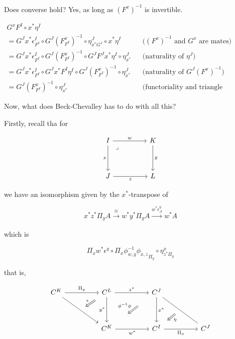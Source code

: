 \documentclass[10pt, oneside]{article}
\begin{document}
Does converse hold? Yes, as long as $(F^x)^{-1}$ is invertible.


\begin{align*}
         G^x F^I \circ x^\ast \eta^I 
         \\
         = G^J x^\ast \epsilon^I_{F^I} \circ G^J (F^x_{F^I})^{-1}  \circ \eta^J_{x^\ast G^J} \circ x^\ast \eta^I && \text{($(F^x)^{-1}$ and $G^x$ are mates)}
         \\
         =  G^J x^\ast \epsilon^I_{F^I} \circ G^J (F^x_{F^I})^{-1} \circ G^J F^J x^\ast \eta^I \circ \eta^J_{x^\ast}  && \text{(naturality of $\eta^J$)}
         \\
         =  G^J x^\ast \epsilon^I_{F^I} \circ G^J x^\ast F^I \eta^I \circ G^J (F^x_{F^I})^{-1} \circ \eta^J_{x^\ast}  && \text{(naturality of $G^J (F^x)^{-1}$)}
         \\
         = G^J (F^x_{F^I})^{-1} \circ \eta^J_{x^\ast}  && \text{(functoriality and triangle identities)}
\end{align*}

Now, what does Beck-Chevalley has to do with all this?

Firstly, recall tha for

    \[\begin{tikzcd}[ampersand replacement=\&]
	I \&\& K \\
	\\
	J \&\& L
	\arrow["w", from=1-1, to=1-3]
	\arrow["x"', from=1-1, to=3-1]
	\arrow["z"', from=3-1, to=3-3]
	\arrow["y", from=1-3, to=3-3]
	\arrow["\lrcorner"{anchor=center, pos=0.125}, draw=none, from=1-1, to=3-3]
    \end{tikzcd}\]

    \noindent we have an isomorphism given by the $x^\ast$-transpose of

    $$x^\ast z^\ast \Pi_y A \xrightarrow[]{\cong} w^\ast y^\ast \Pi_y A \xrightarrow[]{w^\ast \epsilon^y_A} w^\ast A$$

    \noindent which is

    $$\Pi_x w^\ast \epsilon^y \circ \Pi_x {\phi^{-1}_{w, y} \phi_{x, z}}_{\Pi_y}  \circ \eta^x_{z^\ast \Pi_y}$$

    \noindent that is,

    \[\begin{tikzcd}
	{C^K} && {C^L} && {C^J} \\
	\\
	&& {C^K} && {C^I} && {C^J}
	\arrow["{z^\ast}", from=1-3, to=1-5]
	\arrow["{x^\ast}", from=1-5, to=3-5]
	\arrow["{y^\ast}"', from=1-3, to=3-3]
	\arrow["{w^\ast}"', from=3-3, to=3-5]
	\arrow["{\phi^{-1} \phi}"', shorten <=22pt, shorten >=22pt, Rightarrow, from=1-5, to=3-3]
	\arrow["{\Pi_x}"', from=3-5, to=3-7]
	\arrow[""{name=0, anchor=center, inner sep=0}, no head, from=1-5, to=3-7]
	\arrow[""{name=1, anchor=center, inner sep=0}, from=1-1, to=3-3]
	\arrow["{\Pi_y}", from=1-1, to=1-3]
	\arrow["\eta", shorten <=8pt, shorten >=6pt, Rightarrow, from=0, to=3-5]
	\arrow["\epsilon"', shorten <=8pt, shorten >=8pt, Rightarrow, from=1-3, to=1]
\end{tikzcd}\]
\end{document}
